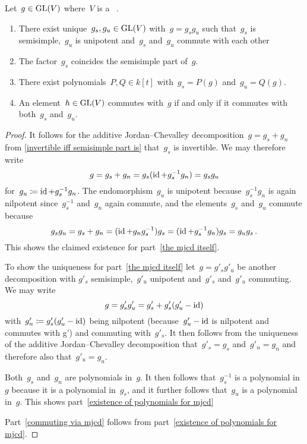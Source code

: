 \begin{proposition}
  \label{mjcd}
  Let~$g \in \operatorname{GL}(V)$ where~$V$ is a ~.
  \begin{enumerate}
    \item
      \label{the mjcd itself}
      There exist unique~$g_s, g_u \in \operatorname{GL}(V)$ with~$g = g_s g_u$ such that~$g_s$ is semisimple,~$g_u$ is unipotent and~$g_s$ and~$g_u$ commute with each other
    \item
      The factor~$g_s$ coincides the semisimple part of~$g$.
    \item
      \label{existence of polynomials for mjcd}
      There exist polynomials~$P, Q \in k[t]$ with~$g_s = P(g)$ and~$g_u = Q(g)$.
    \item
      \label{commuting via mjcd}
      An element~$h \in \operatorname{GL}(V)$ commutes with~$g$ if and only if it commutes with both~$g_s$ and~$g_u$.
  \end{enumerate}
\end{proposition}


\begin{proof}
  It follows for the additive Jordan\nobreakdash--Chevalley decomposition~$g = g_s + g_n$ from \cref{invertible iff semisimple part is} that~$g_s$ is invertible.
  We may therefore write
  \[
      g
    = g_s + g_n
    = g_s (\operatorname{id} + g_s^{-1} g_n)
    = g_s g_u
  \]
  for~$g_u \coloneqq \operatorname{id} + g_s^{-1} g_n$.
  The endomorphism~$g_u$ is unipotent because~$g_s^{-1} g_n$ is again nilpotent since~$g_s^{-1}$ and~$g_n$ again commute, and the elements~$g_s$ and~$g_u$ commute because
  \[
      g_s g_u
    = g_s + g_n
    = (\operatorname{id} + g_n g_s^{-1}) g_s
    = (\operatorname{id} + g_s^{-1} g_n) g_s
    = g_u g_s \,.
  \]
  This shows the claimed existence for part~\ref*{the mjcd itself}.
  
  To show the uniqueness for part~\ref*{the mjcd itself} let~$g = g'_s g'_u$ be another decomposition with $g'_s$ semisimple,~$g'_u$ unipotent and~$g'_s$ and~$g'_u$ commuting.
  We may write
  \[
      g
    = g'_s g'_u
    = g'_s + g'_s (g'_u - \operatorname{id})
  \]
  with~$g'_n \coloneqq g'_s (g'_u - \operatorname{id})$ being nilpotent (because~$g'_u - \operatorname{id}$ is nilpotent and commutes with g') and commuting with~$g'_s$.
  It then follows from the uniqueness of the additive Jordan\nobreakdash--Chevalley decomposition that~$g'_s = g_s$ and~$g'_n = g_n$ and therefore also that~$g'_u = g_u$.
  
  Both~$g_s$ and~$g_n$ are polynomials in~$g$.
  It then follows that~$g_s^{-1}$ is a polynomial in~$g$ because it is a polynomial in~$g_s$, and it further follows that~$g_u$ is a polynomial in~$g$.
  This shows part~\ref*{existence of polynomials for mjcd}
  
  Part~\ref*{commuting via mjcd} follows from part~\ref*{existence of polynomials for mjcd}.
\end{proof}


